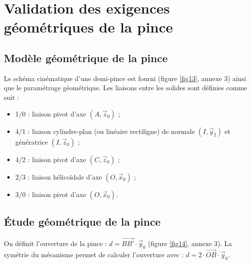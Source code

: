 \section{Validation des exigences géométriques de la pince}

\subsection{Modèle géométrique de la pince}

Le schéma cinématique d'une demi-pince est fourni (figure \ref{fig13}, annexe 3) ainsi que le paramétrage géométrique. Les liaisons entre les solides sont définies comme suit :
\begin{itemize}
    \item 1/0 : liaison pivot d'axe $(A, \vec{z}_0)$ ;
    \item 4/1 : liaison cylindre-plan (ou linéaire rectiligne) de normale $(I, \vec{y}_2)$ et génératrice $(I, \vec{z}_0)$ ;
    \item 4/2 : liaison pivot d'axe $(C, \vec{z}_0)$ ;
    \item 2/3 : liaison hélicoïdale d'axe $(O, \vec{x}_0)$ ;
    \item 3/0 : liaison pivot d'axe $(O, \vec{x}_0)$.
\end{itemize}




\subsection{Étude géométrique de la pince}

On définit l'ouverture de la pince : $d = \overrightarrow{BB'} \cdot \vec{y}_0$ (figure \ref{fig14}, annexe 3). La symétrie du mécanisme permet de calculer l'ouverture avec : $d = 2\cdot\overrightarrow{OB} \cdot \vec{y}_0$.


